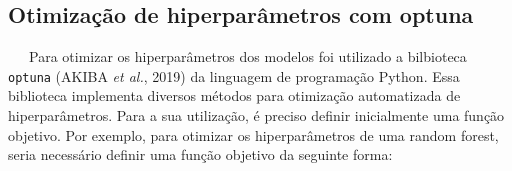 \documentclass[
  12pt,
  a4paper,
]{scrreprt}
\begin{document}
\vspace{12pt}

\subsection{Otimização de hiperparâmetros com
optuna}\label{otimizauxe7uxe3o-de-hiperparuxe2metros-com-optuna}

~~~Para otimizar os hiperparâmetros dos modelos foi utilizado a
bilbioteca \texttt{optuna} (AKIBA \emph{et al.}, 2019) da linguagem de
programação Python. Essa biblioteca implementa diversos métodos para
otimização automatizada de hiperparâmetros. Para a sua utilização, é
preciso definir inicialmente uma função objetivo. Por exemplo, para
otimizar os hiperparâmetros de uma random forest, seria necessário
definir uma função objetivo da seguinte forma:
\end{document}
